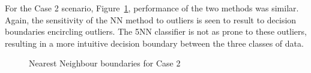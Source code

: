 For the Case 2 scenario, Figure~\ref{fig:nn_boundary_case2}, performance of the two methods was similar. Again, the sensitivity of the NN method to outliers is seen to result to decision boundaries encircling outliers. The 5NN classifier is not as prone to these outliers, resulting in a more intuitive decision boundary between the three classes of data.

\begin{figure}[ht]
\centering
	
	\caption{Nearest Neighbour boundaries for Case 2}
	\label{fig:nn_boundary_case2}
\end{figure}
